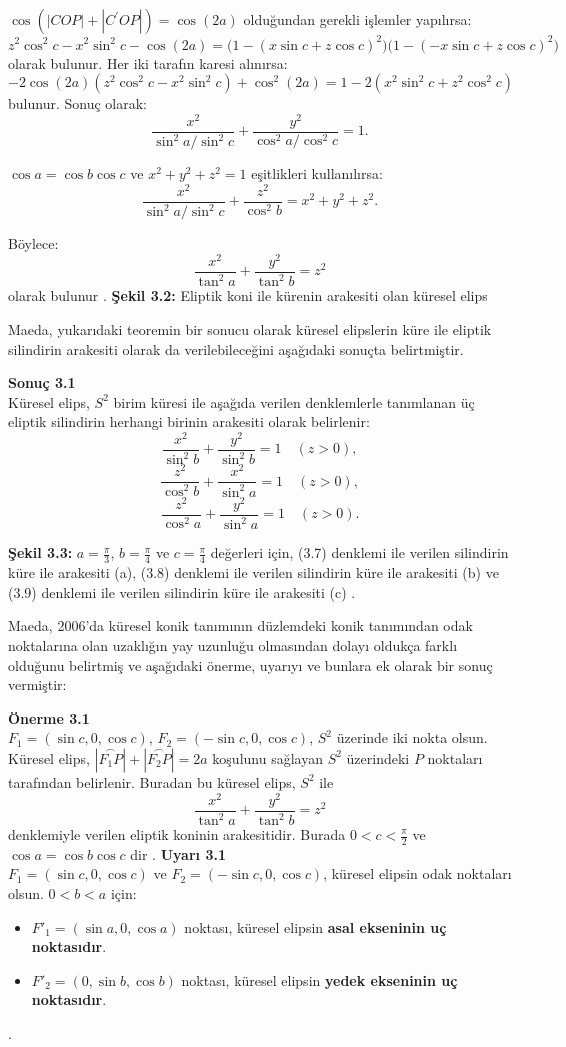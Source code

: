 \documentclass[a4paper,12pt]{article}
\begin{document}
$\cos(|COP| + |C^\prime OP|) = \cos(2a)$ olduğundan gerekli işlemler yapılırsa:
\[
z^2 \cos^2 c - x^2 \sin^2 c - \cos(2a) = \big(1 - (x \sin c + z \cos c)^2\big)\big(1 - (-x \sin c + z \cos c)^2\big)
\]
olarak bulunur. Her iki tarafın karesi alınırsa:
\[
-2 \cos(2a)(z^2 \cos^2 c - x^2 \sin^2 c) + \cos^2(2a) = 1 - 2(x^2 \sin^2 c + z^2 \cos^2 c)
\]
bulunur. Sonuç olarak:
\[
\frac{x^2}{\sin^2 a / \sin^2 c} + \frac{y^2}{\cos^2 a / \cos^2 c} = 1.
\tag{3.4}
\]

$\cos a = \cos b \cos c$ ve $x^2 + y^2 + z^2 = 1$ eşitlikleri kullanılırsa:
\[
\frac{x^2}{\sin^2 a / \sin^2 c} + \frac{z^2}{\cos^2 b} = x^2 + y^2 + z^2.
\tag{3.5}
\]

Böylece:
\[
\frac{x^2}{\tan^2 a} + \frac{y^2}{\tan^2 b} = z^2
\tag{3.6}
\]
olarak bulunur \cite{ref2}.
\textbf{Şekil 3.2:} Eliptik koni ile kürenin arakesiti olan küresel elips

Maeda, yukarıdaki teoremin bir sonucu olarak küresel elipslerin küre ile eliptik silindirin arakesiti olarak da verilebileceğini aşağıdaki sonuçta belirtmiştir.

\textbf{Sonuç 3.1} \\
Küresel elips, $S^2$ birim küresi ile aşağıda verilen denklemlerle tanımlanan üç eliptik silindirin herhangi birinin arakesiti olarak belirlenir:
\[
\frac{x^2}{\sin^2 b} + \frac{y^2}{\sin^2 b} = 1 \quad (z > 0), \tag{3.7}
\]
\[
\frac{z^2}{\cos^2 b} + \frac{x^2}{\sin^2 a} = 1 \quad (z > 0), \tag{3.8}
\]
\[
\frac{z^2}{\cos^2 a} + \frac{y^2}{\sin^2 a} = 1 \quad (z > 0). \tag{3.9}
\]

\textbf{Şekil 3.3:} $a = \frac{\pi}{3}$, $b = \frac{\pi}{4}$ ve $c = \frac{\pi}{4}$ değerleri için, (3.7) denklemi ile verilen silindirin küre ile arakesiti (a), (3.8) denklemi ile verilen silindirin küre ile arakesiti (b) ve (3.9) denklemi ile verilen silindirin küre ile arakesiti (c) \cite{ref1}.

Maeda, 2006’da küresel konik tanımının düzlemdeki konik tanımından odak noktalarına olan uzaklığın yay uzunluğu olmasından dolayı oldukça farklı olduğunu belirtmiş ve aşağıdaki önerme, uyarıyı ve bunlara ek olarak bir sonuç vermiştir:

\textbf{Önerme 3.1} \\
$F_1 = (\sin c, 0, \cos c)$, $F_2 = (-\sin c, 0, \cos c)$, $S^2$ üzerinde iki nokta olsun. Küresel elips, $|\overset{\frown}{F_1P}| + |\overset{\frown}{F_2P}| = 2a$ koşulunu sağlayan $S^2$ üzerindeki $P$ noktaları tarafından belirlenir. Buradan bu küresel elips, $S^2$ ile
\[
\frac{x^2}{\tan^2 a} + \frac{y^2}{\tan^2 b} = z^2
\]
denklemiyle verilen eliptik koninin arakesitidir. Burada $0 < c < \frac{\pi}{2}$ ve $\cos a = \cos b \cos c$ dir \cite{ref2}.
\textbf{Uyarı 3.1} \\
$F_1 = (\sin c, 0, \cos c)$ ve $F_2 = (-\sin c, 0, \cos c)$, küresel elipsin odak noktaları olsun. $0 < b < a$ için:
\begin{itemize}
    \item $F'_1 = (\sin a, 0, \cos a)$ noktası, küresel elipsin \textbf{asal ekseninin uç noktasıdır}.
    \item $F'_2 = (0, \sin b, \cos b)$ noktası, küresel elipsin \textbf{yedek ekseninin uç noktasıdır}.
\end{itemize}
\cite{ref1}.
\end{document}
